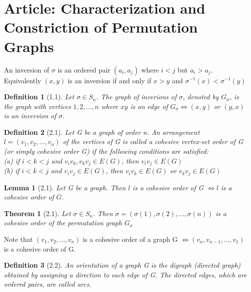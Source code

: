 \documentclass{article}
\newtheorem*{definition}{Definition}
\newtheorem*{theorem}{Theorem}
\newtheorem*{lemma}{Lemma}
\begin{document}
\pagestyle{empty}

\begin{comment}
definitions
\end{comment}

\section{ Article: Characterization and Constriction of Permutation Graphs }
An inversion of $\sigma$ is an ordered pair $(a_i, a_j)$ where $i < j$ but $a_i > a_j$. Equivalently $(x, y)$ is an inversion if and only if $x > y$ and $\sigma^{-1}(x) < \sigma^{-1}(y)$ 

\begin{definition}[1.1]
    Let $\sigma \in S_n$. The graph of inverions of $\sigma$, denoted by $G_{\sigma}$, is the graph with vertices $1,2,...,n$ where $xy$ is an edge of $G_{\sigma} \Leftrightarrow (x, y)$ or $(y, x)$ is an inversion of $\sigma$. 
\end{definition}

\begin{definition}[2.1]
    Let G be a graph of order n. An arrangement $l = (v_1, v_2, ..., v_n)$ of the vertices of G is called a cohesive vertex-set order of G (or simply cohesive order G) if the following conditions are satisfied:\\
    (a) if $i < k < j$ and $v_iv_k, v_kv_j \in E(G)$, then $v_iv_j \in E(G)$ \\
    (b) if $i < k < j$ and $v_iv_j \in E(G)$, then $v_iv_k \in E(G)$ or $v_kv_j \in E(G)$ \\
\end{definition}

\begin{lemma}[2.1]
    Let G be a graph. Then $l$ is a cohesive order of G $\Leftrightarrow l$ is a cohesive order of $\overline{G}$.
\end{lemma}

\begin{theorem}[2.1]
    Let $\sigma \in S_n$. Then $\sigma = (\sigma(1),\sigma(2),...,\sigma(n))$ is a cohesive order of the permutation graph $G_{\sigma}$
\end{theorem}

Note that $(v_1, v_2, ..., v_n)$ is a cohesive order of a graph G $\Leftrightarrow (v_n, v_{n-1}, ..., v_1)$ is a cohesive order of G.

\begin{definition}[2.2]
    An orientation of a graph G is the digraph (directed graph) obtained by assigning a direction to each edge of G. The directed edges, which are ordered pairs, are called arcs.
\end{definition}
\end{document}
